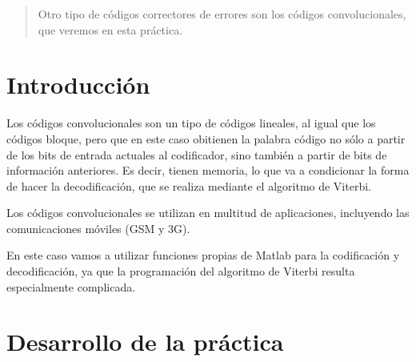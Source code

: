 \documentclass[es,practica,12pt]{uah}
\begin{document}

\maketitle

\begin{abstract}
	Otro tipo de códigos correctores de errores son los códigos convolucionales, que veremos en esta práctica.
\end{abstract}

\section{Introducción}

Los códigos convolucionales son un tipo de códigos lineales, al igual que los códigos bloque, pero que en este caso obitienen la palabra código no sólo a partir de los bits de entrada actuales al codificador, sino también a partir de bits de información anteriores. Es decir, tienen memoria, lo que va a condicionar la forma de hacer la decodificación, que se realiza mediante el algoritmo de Viterbi. 

Los códigos convolucionales se utilizan en multitud de aplicaciones, incluyendo las comunicaciones móviles (GSM y 3G). 

En este caso vamos a utilizar funciones propias de Matlab para la codificación y decodificación, ya que la programación del algoritmo de Viterbi resulta especialmente complicada. 

\section{Desarrollo de la práctica}
\end{document}
